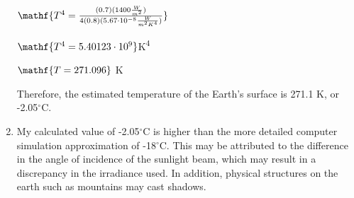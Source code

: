 \documentclass{homework}
\begin{document}
\begin{enumerate}[label=(\alph*)]
\begin{center}
        $\mathf{T^4 = \frac{(0.7)(1400\frac{W}{m^2})}{4(0.8)(5.67\cdot 10^{-8}\frac{W}{m^2K^4})}}$
    \end{center}
    \begin{center}
        $\mathf{T^4 = 5.40123 \cdot 10^{9}}$K\textsuperscript{4}
    \end{center}
    \begin{center}
        $\mathf{T = 271.096}$ K
    \end{center}
    Therefore, the estimated temperature of the Earth's surface is 271.1 K, or -2.05$^{\circ}$C.
    \item My calculated value of -2.05$^{\circ}$C is higher than the more detailed computer simulation approximation of -18${^\circ}$C. This may be attributed to the difference in the angle of incidence of the sunlight beam, which may result in a discrepancy in the irradiance used. In addition, physical structures on the earth such as mountains may cast shadows.
\end{enumerate}
\end{document}
